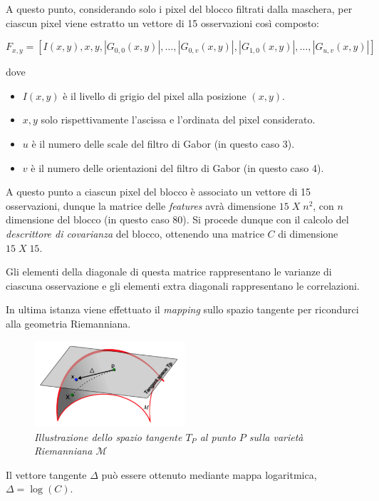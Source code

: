 A questo punto, considerando solo i pixel del blocco filtrati dalla maschera, per ciascun pixel viene estratto un vettore di 15 osservazioni così composto:

$$F_{x,y} = [I(x, y), x, y, |G_{0,0}(x, y)|, \ldots, |G_{0, v}(x, y)|, |G_{1, 0}(x, y)|, \ldots, |G_{u, v}(x, y)|]$$

dove 
\begin{itemize}
\item $I(x, y)$ è il livello di grigio del pixel alla posizione $(x, y)$.
\item $x, y$ solo rispettivamente l'ascissa e l'ordinata del pixel considerato.
\item $u$ è il numero delle scale del filtro di Gabor (in questo caso 3).
\item $v$ è il numero delle orientazioni del filtro di Gabor (in questo caso 4).
\end{itemize}

A questo punto a ciascun pixel del blocco è associato un vettore di 15 osservazioni, dunque la matrice delle \emph{features} avrà dimensione $15\; X\; n^2$, con $n$ dimensione del blocco (in questo caso 80).
Si procede dunque con il calcolo del \emph{descrittore di covarianza} del blocco, ottenendo una matrice $C$ di dimensione $15 \; X \; 15$.

Gli elementi della diagonale di questa matrice rappresentano le varianze di ciascuna osservazione e gli elementi extra diagonali rappresentano le correlazioni. 

In ultima istanza viene effettuato il \emph{mapping} sullo spazio tangente per ricondurci alla geometria Riemanniana.

\begin{figure}[H] 
  \centering
    \includegraphics[width=0.5\textwidth]{images/tangent_space.png}
    \caption{{\textit{Illustrazione dello spazio tangente $T_P$ al punto $P$ sulla varietà Riemanniana $\mathcal{M}$}}}
\end{figure}

Il vettore tangente $\Delta$ può essere ottenuto mediante mappa logaritmica, $\Delta = \log(C)$.

